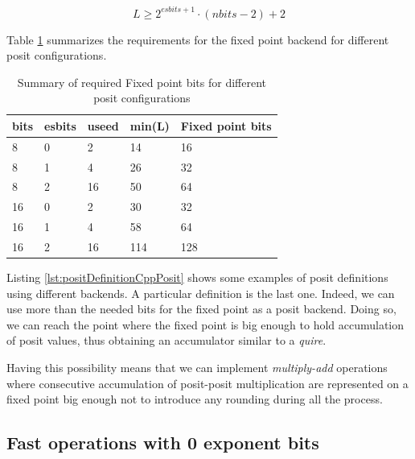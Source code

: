 \begin{equation}
    L \geq 2^{esbits + 1} \cdot (nbits - 2) + 2
\end{equation}

Table \ref{tab:fixedPointToPositSize} summarizes the requirements for the fixed point backend for different posit configurations.

\begin{table}[]
\centering
\caption{Summary of required Fixed point bits for different posit configurations}
\label{tab:fixedPointToPositSize}
\begin{tabular}{lllll}

bits & esbits & useed & min(L) & Fixed point bits \\ \hline
8    & 0      & 2     & 14     & 16               \\
8    & 1      & 4     & 26     & 32               \\
8    & 2      & 16    & 50     & 64               \\
16   & 0      & 2     & 30     & 32               \\
16   & 1      & 4     & 58     & 64               \\
16   & 2      & 16    & 114    & 128              \\ \hline
\end{tabular}
\end{table}

Listing \ref{lst:positDefinitionCppPosit} shows some examples of posit definitions using different backends. A particular definition is the last one. Indeed, we can use more than the needed bits for the fixed point as a posit backend. Doing so, we can reach the point where the fixed point is big enough to hold accumulation of posit values, thus obtaining an accumulator similar to a \textit{quire}.

Having this possibility means that we can implement \textit{multiply-add} operations where consecutive accumulation of posit-posit multiplication are represented on a fixed point big enough not to introduce any rounding during all the process.  





\subsection{Fast operations with 0 exponent bits}

